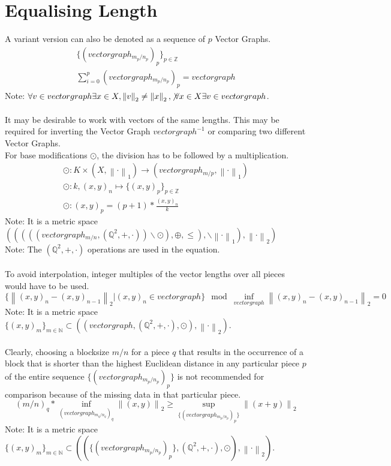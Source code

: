 \documentclass{report}
\newcommand\norm[1]{\left\lVert#1\right\rVert}
\begin{document}
\section{Equalising Length}
A variant version can also be denoted as a sequence of $p$ Vector Graphs.
\begin{align}
\{(vectorgraph_{m_{p}/n_{p}})_{p}\}_{p\in \mathbb{Z}}\\
\sum \limits _{i=0}^{p} (vectorgraph_{m_{p}/n_{p}})_p = vectorgraph
\end{align}
Note: $\forall v \in vectorgraph\exists x \in X,\norm{v}_2\not =\norm{x}_2,\not\forall x \in X\exists v \in vectorgraph$.\\\\
It may be desirable to work with vectors of the same lengths. This may be required for inverting the Vector Graph $vectorgraph^{-1}$ or comparing two different Vector Graphs.\\
For base modifications $\odot$, the division has to be followed by a multiplication.
\begin{align}
\odot : K\times (X, \norm{\cdot}_1) \rightarrow (vectorgraph_{m/p}, \norm{\cdot}_1)\\
\odot : k,(x,y)_{n} \mapsto \{(x,y)_p\}_{p\in \mathbb{Z}}\\
\odot : (x,y)_{p} = (p+1) * \frac{(x,y)_{n}}{k}
\end{align}
Note: It is a metric space $(((((vectorgraph_{m/n},(\mathbb{Q}^2,+,\cdot))\backslash\odot),\oplus,\leq),\backslash\norm{\cdot}_1), \norm{\cdot}_2)$\\
Note: The $(\mathbb{Q}^2,+,\cdot)$ operations are used in the equation.\\\\
To avoid interpolation, integer multiples of the vector lengths over all pieces would have to be used.
\begin{equation}
\{\norm{(x,y)_{n}-(x,y)_{n-1}}_2\vert (x,y)_{n} \in vectorgraph\} \mod \inf \limits _{vectorgraph} \norm{(x,y)_{n}-(x,y)_{n-1}}_2 = 0
\end{equation}
Note: It is a metric space $\{(x,y)_{m}\}_{m \in \mathbb{N}} \subset ((vectorgraph,(\mathbb{Q}^2,+,\cdot),\odot),\norm{\cdot}_2)$.\\\\
Clearly, choosing a blocksize $m/n$ for a piece $q$ that results in the occurrence of a block that is shorter than the highest Euclidean distance in any particular piece $p$ of the entire sequence $\{(vectorgraph_{m_{p}/n_{p}})_{p}\}$ is not recommended for comparison because of the missing data in that particular piece.
\begin{equation}
(m/n)_{q}*\inf \limits _{(vectorgraph_{m_{q}/n_{q}})_{q}} \norm{(x,y)}_2 \geq \sup \limits _{\{(vectorgraph_{m_{p}/n_{p}})_{p}\}} \norm{(x+y)}_2\label{eq:4}
\end{equation}
Note: It is a metric space $\{(x,y)_{m}\}_{m \in \mathbb{N}} \subset ((\{(vectorgraph_{m_{p}/n_{p}})_{p}\},(\mathbb{Q}^2,+,\cdot),\odot),\norm{\cdot}_2)$.
\end{document}

